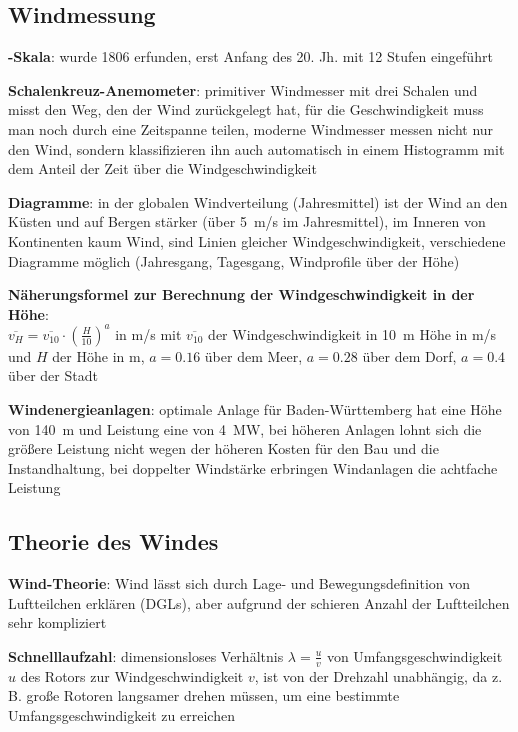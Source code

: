 \subsection{%
    Windmessung%
}

\textbf{-Skala}:
wurde 1806 erfunden, erst Anfang des 20. Jh. mit 12 Stufen eingeführt

\textbf{Schalenkreuz-Anemometer}:
primitiver Windmesser mit drei Schalen
und misst den Weg, den der Wind zurückgelegt hat,
für die Geschwindigkeit muss man noch durch eine Zeitspanne teilen,
moderne Windmesser messen nicht nur den Wind,
sondern klassifizieren ihn auch automatisch in einem Histogramm mit dem Anteil der Zeit
über die Windgeschwindigkeit

\textbf{Diagramme}:
in der globalen Windverteilung (Jahresmittel) ist der Wind an den Küsten und auf Bergen stärker
(über \SI{5}{\meter/\second} im Jahresmittel),
im Inneren von Kontinenten kaum Wind,
 sind Linien gleicher Windgeschwindigkeit,
verschiedene Diagramme möglich
(Jahresgang, Tagesgang, Windprofile über der Höhe)

\textbf{Näherungsformel zur Berechnung der Windgeschwindigkeit in der Höhe}:\\
$\overline{v_H} = \overline{v_{10}} \cdot \left(\frac{H}{10}\right)^a$
in \si{\meter/\second} mit $\overline{v_{10}}$ der Windgeschwindigkeit in \SI{10}{\meter} Höhe
in \si{\meter/\second} und $H$ der Höhe in \si{\meter},
$a = \num{0.16}$ über dem Meer,
$a = \num{0.28}$ über dem Dorf,
$a = \num{0.4}$ über der Stadt

\textbf{Windenergieanlagen}:
optimale Anlage für Baden-Württemberg hat eine
Höhe von \SI{140}{\meter} und Leistung eine von \SI{4}{\mega\watt},
bei höheren Anlagen lohnt sich die größere Leistung nicht wegen der höheren Kosten für den
Bau und die Instandhaltung,
bei doppelter Windstärke erbringen Windanlagen die achtfache Leistung

\pagebreak

\subsection{%
    Theorie des Windes%
}

\textbf{Wind-Theorie}:
Wind lässt sich durch Lage- und Bewegungsdefinition von Luftteilchen erklären (DGLs),
aber aufgrund der schieren Anzahl der Luftteilchen sehr kompliziert

\textbf{Schnelllaufzahl}:
dimensionsloses Verhältnis $\lambda = \frac{u}{v}$ von
Umfangsgeschwindigkeit $u$ des Rotors zur Windgeschwindigkeit $v$,
ist von der Drehzahl unabhängig,
da z.\,B. große Rotoren langsamer drehen müssen, um eine bestimmte Umfangsgeschwindigkeit zu
erreichen

